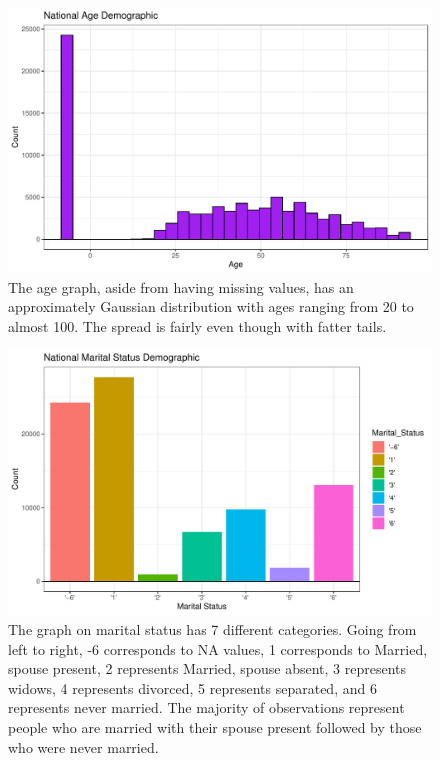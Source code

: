 \documentclass{article}
\begin{document}
\begin{figure}[H]
\includegraphics{Thesis_Proposal-003}
\caption{The age graph, aside from having missing values, has an approximately Gaussian distribution with ages ranging from 20 to almost 100. The spread is fairly even though with fatter tails.}
\label{Figure 2}
\end{figure}
\newpage
\begin{figure}[H]
\centering
\includegraphics{Thesis_Proposal-004}
\caption{The graph on marital status has 7 different categories. Going from left to right, -6 corresponds to NA values, 1 corresponds to Married, spouse present, 2 represents Married, spouse absent, 3 represents widows, 4 represents divorced, 5 represents separated, and 6 represents never married. The majority of observations represent people who are married with their spouse present followed by those who were never married.}
\label{Figure 3}
\end{figure}
\end{document}
